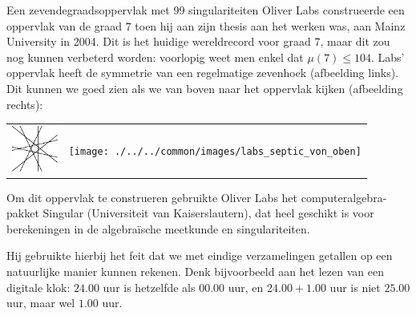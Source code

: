 \begin{surferPage}[Labs]{Een zevendegraadsoppervlak met 99 singulariteiten}
    Oliver Labs construeerde een oppervlak van de graad $7$ toen hij aan zijn thesis aan het werken was, aan Mainz University in 2004. Dit is het huidige wereldrecord voor graad $7$, maar dit zou nog kunnen verbeterd worden: voorlopig weet men enkel dat $\mu(7) \leqslant 104$.
    Labs' oppervlak heeft de symmetrie van een regelmatige zevenhoek (afbeelding links).
    Dit kunnen we goed zien als we van boven naar het oppervlak kijken (afbeelding rechts):

    \vspace*{-0.3em}
    \begin{center}
      \begin{tabular}{c@{\qquad}c}
        \includegraphics[height=1.5cm]{./../../common/images/labsseptic1.pdf}
        &
        \texttt{[image: ./../../common/images/labs\_septic\_von\_oben]}
      \end{tabular}
    \end{center}
    \vspace*{-0.3em}

    Om dit oppervlak te construeren gebruikte Oliver Labs het computeralgebra-pakket
    {\sc Singular} (Universiteit van Kaiserslautern), dat heel geschikt is voor berekeningen in de algebra\"ische meetkunde en singulariteiten.

    Hij gebruikte hierbij het feit dat we met eindige verzamelingen getallen op een natuurlijke manier kunnen rekenen. Denk bijvoorbeeld aan het lezen van een digitale klok: $24.00$ uur is hetzelfde als $00.00$ uur, en $24.00 + 1.00$ uur is niet $25.00$ uur, maar wel $1.00$ uur. 
\end{surferPage}
